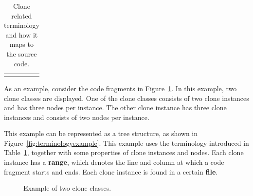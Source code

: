 \begin{table}[H]
\begin{tabular}{@{}lllll@{}}
\rowcolor[HTML]{FFFFFF}
 \bottomrule
\end{tabular}%
\caption{Clone related terminology and how it maps to the source code.}
\label{tab:clone-terminology}
\end{table}

As an example, consider the code fragments in Figure~\ref{fig:cloneclasses}. In this example, two clone classes are displayed. One of the clone classes consists of two clone instances and has three nodes per instance. The other clone instance has three clone instances and consists of two nodes per instance.

This example can be represented as a tree structure, as shown in Figure~\ref{fig:terminologyexample}. This example uses the terminology introduced in Table~\ref{tab:clone-terminology}, together with some properties of clone instances and nodes. Each clone instance has a \textbf{range}, which denotes the line and column at which a code fragment starts and ends. Each clone instance is found in a certain \textbf{file}.

\begin{figure}[H]
\begin{parcolumns}{3}
\end{parcolumns}
\caption{Example of two clone classes.}
\label{fig:cloneclasses}
\end{figure}


